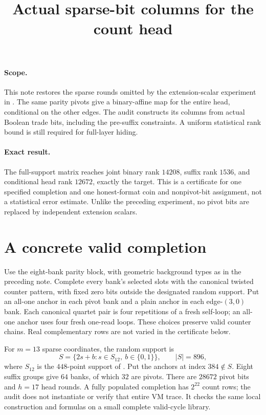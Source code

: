 \documentclass[11pt]{article}
\title{Actual sparse-bit columns for the count head}
\author{}
\date{}
\begin{document}
\maketitle
\vspace{-2em}

\paragraph{Scope.} This note restores the sparse rounds omitted by the extension-scalar experiment in . The same parity pivots give a binary-affine map for the entire head, conditional on the other edges. The audit constructs its columns from actual Boolean trade bits, including the pre-suffix constraints. A uniform statistical rank bound is still required for full-layer hiding.

\paragraph{Exact result.} The full-support matrix reaches joint binary rank $14208$, suffix rank $1536$, and conditional head rank $12672$, exactly the target. This is a certificate for one specified completion and one honest-format coin and nonpivot-bit assignment, not a statistical error estimate. Unlike the preceding experiment, no pivot bits are replaced by independent extension scalars.

\section{A concrete valid completion}

Use the eight-bank parity block, with geometric background types as in the preceding note. Complete every bank's selected slots with the canonical twisted counter pattern, with fixed zero bits outside the designated random support. Put an all-one anchor in each pivot bank and a plain anchor in each edge-$(3,0)$ bank. Each canonical quartet pair is four repetitions of a fresh self-loop; an all-one anchor uses four fresh one-read loops. These choices preserve valid counter chains. Real complementary rows are not varied in the certificate below.

For $m=13$ sparse coordinates, the random support is
\[
 S=\{2s+b:s\in S_{12},\ b\in\{0,1\}\},\qquad |S|=896,
\]
where $S_{12}$ is the $448$-point support of . Put the anchors at index $384\notin S$. Eight suffix groups give $64$ banks, of which $32$ are pivots. There are $28672$ pivot bits and $h=17$ head rounds. A fully populated completion has $2^{22}$ count rows; the audit does not instantiate or verify that entire VM trace. It checks the same local construction and formulas on a small complete valid-cycle library.
\end{document}
